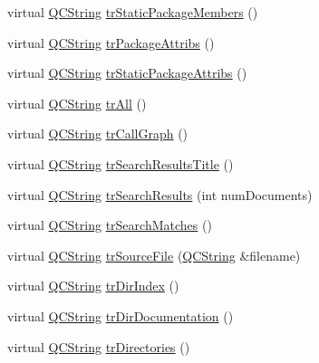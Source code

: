 \begin{DoxyCompactItemize}
\item 
virtual \mbox{\hyperlink{class_q_c_string}{Q\+C\+String}} \mbox{\hyperlink{class_translator_croatian_ad5c1224f1961409410fa73c552e15e51}{tr\+Static\+Package\+Members}} ()
\item 
virtual \mbox{\hyperlink{class_q_c_string}{Q\+C\+String}} \mbox{\hyperlink{class_translator_croatian_aab3bd717048978cc268622ce5cce1675}{tr\+Package\+Attribs}} ()
\item 
virtual \mbox{\hyperlink{class_q_c_string}{Q\+C\+String}} \mbox{\hyperlink{class_translator_croatian_a6c742527cc027b554c1614b41d89f9c5}{tr\+Static\+Package\+Attribs}} ()
\item 
virtual \mbox{\hyperlink{class_q_c_string}{Q\+C\+String}} \mbox{\hyperlink{class_translator_croatian_ac1eae452db2fbba201451b76e80c827d}{tr\+All}} ()
\item 
virtual \mbox{\hyperlink{class_q_c_string}{Q\+C\+String}} \mbox{\hyperlink{class_translator_croatian_a723e2ef503d3a4da00dcb34b19178c20}{tr\+Call\+Graph}} ()
\item 
virtual \mbox{\hyperlink{class_q_c_string}{Q\+C\+String}} \mbox{\hyperlink{class_translator_croatian_ace8f65acf8eb74d456c987d6d63b4a7d}{tr\+Search\+Results\+Title}} ()
\item 
virtual \mbox{\hyperlink{class_q_c_string}{Q\+C\+String}} \mbox{\hyperlink{class_translator_croatian_a5ee45a6e21d78cdc53e6ed2e36ba8285}{tr\+Search\+Results}} (int num\+Documents)
\item 
virtual \mbox{\hyperlink{class_q_c_string}{Q\+C\+String}} \mbox{\hyperlink{class_translator_croatian_a7f376084ac5b3f34dcd423e046a8b4c4}{tr\+Search\+Matches}} ()
\item 
virtual \mbox{\hyperlink{class_q_c_string}{Q\+C\+String}} \mbox{\hyperlink{class_translator_croatian_a442c63c810383f3dbab7f874bf6d248e}{tr\+Source\+File}} (\mbox{\hyperlink{class_q_c_string}{Q\+C\+String}} \&filename)
\item 
virtual \mbox{\hyperlink{class_q_c_string}{Q\+C\+String}} \mbox{\hyperlink{class_translator_croatian_ad8c5567eeebfd21c08cb853e31f66a5d}{tr\+Dir\+Index}} ()
\item 
virtual \mbox{\hyperlink{class_q_c_string}{Q\+C\+String}} \mbox{\hyperlink{class_translator_croatian_a885f3f4960c83f070ac69639df98eadf}{tr\+Dir\+Documentation}} ()
\item 
virtual \mbox{\hyperlink{class_q_c_string}{Q\+C\+String}} \mbox{\hyperlink{class_translator_croatian_a6812879b0f7ebb41731785f8fc241487}{tr\+Directories}} ()
\item 

\end{DoxyCompactItemize}
